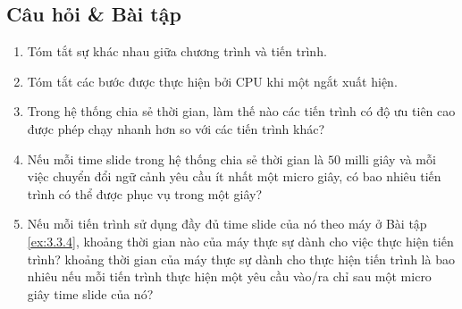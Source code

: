 \subsection*{Câu hỏi \& Bài tập}
\begin{enumerate}
\item Tóm tắt sự khác nhau giữa chương trình và tiến trình.

\item Tóm tắt các bước được thực hiện bởi CPU khi một ngắt xuất hiện.

\item Trong hệ thống chia sẻ thời gian, làm thế nào các tiến trình có
  độ ưu tiên cao được phép chạy nhanh hơn so với các tiến trình khác?

\item Nếu mỗi time slide trong hệ thống chia sẻ thời gian là $50$
  milli giây và mỗi việc chuyển đổi ngữ cảnh yêu cầu ít nhất một micro
  giây, có bao nhiêu tiến trình có thể được phục vụ trong một giây?
\label{ex:3.3.4}

\item Nếu mỗi tiến trình sử dụng đầy đủ time slide của nó theo máy ở
  Bài tập \ref{ex:3.3.4}, khoảng thời gian nào của máy thực sự dành
  cho việc thực hiện tiến trình? khoảng thời gian của máy thực sự dành
  cho thực hiện tiến trình là bao nhiêu nếu mỗi tiến trình thực hiện
  một yêu cầu vào/ra chỉ sau một micro giây time slide của nó?
\end{enumerate}







